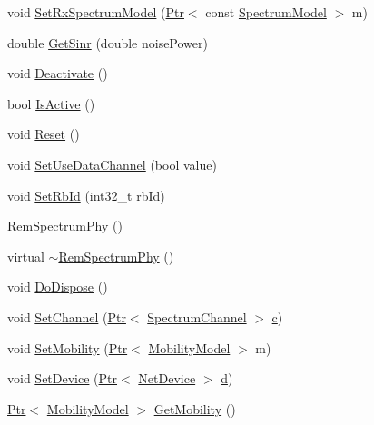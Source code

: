 \begin{DoxyCompactItemize}
\item 
void \hyperlink{classns3_1_1RemSpectrumPhy_aa5f69cafa4dbbea74b66d552a2dfdd82}{Set\+Rx\+Spectrum\+Model} (\hyperlink{classns3_1_1Ptr}{Ptr}$<$ const \hyperlink{classns3_1_1SpectrumModel}{Spectrum\+Model} $>$ m)
\item 
double \hyperlink{classns3_1_1RemSpectrumPhy_a1835a26b78604605824ca016575356d2}{Get\+Sinr} (double noise\+Power)
\item 
void \hyperlink{classns3_1_1RemSpectrumPhy_a514eba9cfa0d52031036bee6b71d4f58}{Deactivate} ()
\item 
bool \hyperlink{classns3_1_1RemSpectrumPhy_a24f74606d67b49246c70ee32a2ecf1bf}{Is\+Active} ()
\item 
void \hyperlink{classns3_1_1RemSpectrumPhy_a4880d01719192d6c8392ad6ab1e4732d}{Reset} ()
\item 
void \hyperlink{classns3_1_1RemSpectrumPhy_ad4a39b25e22449e590aeea10ba2ff03d}{Set\+Use\+Data\+Channel} (bool value)
\item 
void \hyperlink{classns3_1_1RemSpectrumPhy_a8f4467027537234114aaf8c7cf9a7065}{Set\+Rb\+Id} (int32\+\_\+t rb\+Id)
\item 
\hyperlink{classns3_1_1RemSpectrumPhy_a100e387daa9172640b7813876e377bf5}{Rem\+Spectrum\+Phy} ()
\item 
virtual \hyperlink{classns3_1_1RemSpectrumPhy_a13a98b27c831cc9b9c53d5e8398919a5}{$\sim$\+Rem\+Spectrum\+Phy} ()
\item 
void \hyperlink{classns3_1_1RemSpectrumPhy_a6af9c2e019c49ddd74a538d15ebeadd2}{Do\+Dispose} ()
\item 
void \hyperlink{classns3_1_1RemSpectrumPhy_ab5d3920e9d10c669a9b679c634d85454}{Set\+Channel} (\hyperlink{classns3_1_1Ptr}{Ptr}$<$ \hyperlink{classns3_1_1SpectrumChannel}{Spectrum\+Channel} $>$ \hyperlink{mmwave_2model_2fading-traces_2fading__trace__generator_8m_ae0323a9039add2978bf5b49550572c7c}{c})
\item 
void \hyperlink{classns3_1_1RemSpectrumPhy_a421e3d3a72fa50dda38a7356155874f1}{Set\+Mobility} (\hyperlink{classns3_1_1Ptr}{Ptr}$<$ \hyperlink{classns3_1_1MobilityModel}{Mobility\+Model} $>$ m)
\item 
void \hyperlink{classns3_1_1RemSpectrumPhy_ae75d57ec3ce80b1050aaa35ec87d5791}{Set\+Device} (\hyperlink{classns3_1_1Ptr}{Ptr}$<$ \hyperlink{classns3_1_1NetDevice}{Net\+Device} $>$ \hyperlink{lte__pathloss_8m_a1aabac6d068eef6a7bad3fdf50a05cc8}{d})
\item 
\hyperlink{classns3_1_1Ptr}{Ptr}$<$ \hyperlink{classns3_1_1MobilityModel}{Mobility\+Model} $>$ \hyperlink{classns3_1_1RemSpectrumPhy_a75a7cc3b096ee8756b31a6456b29e00a}{Get\+Mobility} ()

\end{DoxyCompactItemize}
